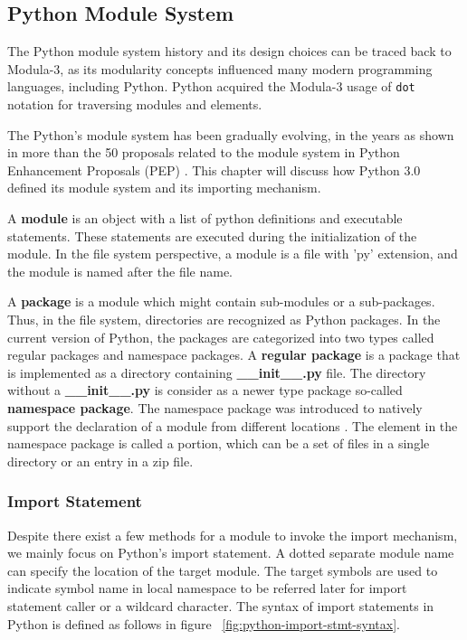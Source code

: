 
\subsection{Python Module System}

The Python module system history and its design choices can be traced back to Modula-3\cite{modula-3}, as its modularity concepts influenced many modern programming languages, including Python.
Python acquired the Modula-3 usage of \texttt{dot} notation for traversing modules and elements\cite{python-foreward-essay}.

The Python's module system has been gradually evolving, in the years as shown in more than the 50 proposals related to the module system in Python Enhancement Proposals (PEP) \cite{pep0}. This chapter will discuss how Python 3.0 defined its module system and its importing mechanism.

A \textbf{module} is an object with a list of python definitions and executable statements. These statements are executed during the initialization of the module. In the file system perspective, a module is a file with 'py' extension, and the module is named after the file name.

A \textbf{package} is a module which might contain sub-modules or a sub-packages.
Thus, in the file system, directories are recognized as Python packages.
In the current version of Python, the packages are categorized into two types called regular packages and namespace packages.
A \textbf{regular package} is a package that is implemented as a directory containing \textbf{\_\_init\_\_.py} file.
The directory without a \textbf{\_\_init\_\_.py} is consider as a newer type package so-called \textbf{namespace package}.
The namespace package was introduced to natively support the declaration of a module from different locations \cite{pep420}. The element in the namespace package is called a portion, which can be a set of files in a single directory or an entry in a zip file.

\subsubsection{Import Statement}

Despite there exist a few methods for a module to invoke the import mechanism, we mainly focus on Python's import statement.
A dotted separate module name can specify the location of the target module. The target symbols are used to indicate symbol name in local namespace to be referred later for import statement caller or a wildcard character.
The syntax of import statements in Python is defined as follows in figure ~\ref{fig:python-import-stmt-syntax}.


